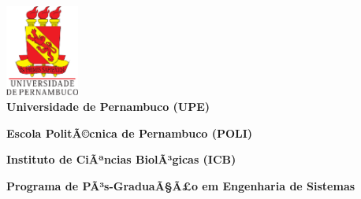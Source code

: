 \begin{titlepage}


\begin{center}

\includegraphics[height=30mm]{Figuras/Capa/brasao_upe}\\





{\textbf{Universidade de Pernambuco (UPE)}}%

{\textbf{Escola PolitÃ©cnica de Pernambuco (POLI)}}%

{\textbf{Instituto de CiÃªncias BiolÃ³gicas (ICB)}} \\ \vspace{2ex}

{\textbf{Programa de PÃ³s-GraduaÃ§Ã£o em Engenharia de Sistemas}} \\ \vspace{1ex}

\vspace{1.0in}


\end{center}
\end{titlepage}
